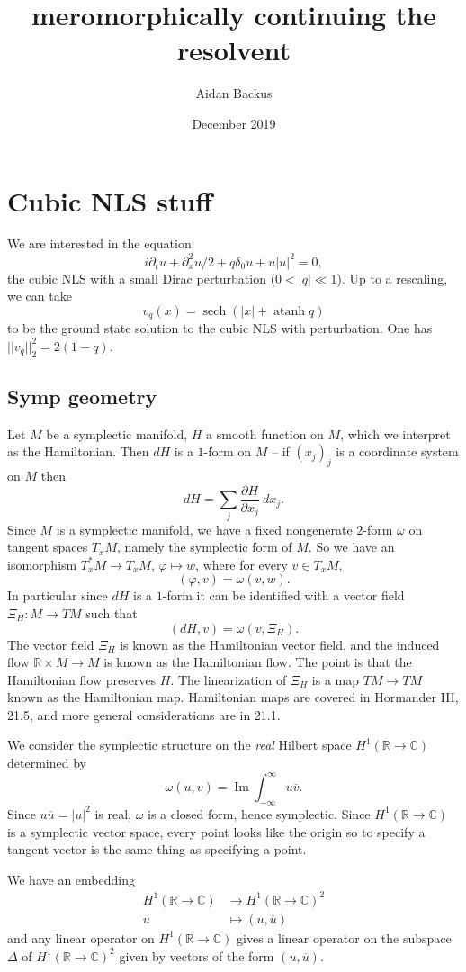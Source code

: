 \documentclass[12pt]{report}
\title{meromorphically continuing the resolvent}
\author{Aidan Backus}
\date{December 2019}
\newcommand{\RR}{\mathbb{R}}
\newcommand{\CC}{\mathbb{C}}
\DeclareMathOperator{\atanh}{atanh}
\DeclareMathOperator{\sech}{sech}
\renewcommand{\Im}{\operatorname{Im}}
\theoremstyle{definition}
\begin{document}
\maketitle

\tableofcontents

\chapter{Cubic NLS stuff}
We are interested in the equation
$$i\partial_t u + \partial_x^2u/2 + q\delta_0 u + u|u|^2 = 0,$$
the cubic NLS with a small Dirac perturbation ($0 < |q| \ll 1$).
Up to a rescaling, we can take
$$v_q(x) = \sech(|x| + \atanh q)$$
to be the ground state solution to the cubic NLS with perturbation. One has $||v_q||_2^2 = 2(1 - q)$.

\section{Symp geometry}
Let $M$ be a symplectic manifold, $H$ a smooth function on $M$, which we interpret as the Hamiltonian.
Then $dH$ is a $1$-form on $M$ -- if $(x_j)_j$ is a coordinate system on $M$ then
$$dH = \sum_j \frac{\partial H}{\partial x_j}~dx_j.$$
Since $M$ is a symplectic manifold, we have a fixed nongenerate $2$-form $\omega$ on tangent spaces $T_xM$, namely the symplectic form of $M$. So we have an isomorphism $T^*_xM \to T_xM$, $\varphi \mapsto w$, where for every $v \in T_xM$,
$$(\varphi, v) = \omega(v, w).$$
In particular since $dH$ is a $1$-form it can be identified with a vector field $\Xi_H: M \to TM$ such that
$$(dH, v) = \omega(v, \Xi_H).$$
The vector field $\Xi_H$ is known as the Hamiltonian vector field, and the induced flow $\RR \times M \to M$ is known as the Hamiltonian flow.
The point is that the Hamiltonian flow preserves $H$.
The linearization of $\Xi_H$ is a map $TM \to TM$ known as the Hamiltonian map. Hamiltonian maps are covered in Hormander III, 21.5, and more general considerations are in 21.1.

We consider the symplectic structure on the \emph{real} Hilbert space $H^1(\RR \to \CC)$ determined by
$$\omega(u, v) = \Im \int_{-\infty}^\infty u\overline v.$$
Since $u\overline u = |u|^2$ is real, $\omega$ is a closed form, hence symplectic.
Since $H^1(\RR \to \CC)$ is a symplectic vector space, every point looks like the origin so to specify a tangent vector is the same thing as specifying a point.

We have an embedding
\begin{align*}
  H^1(\RR \to \CC) &\to H^1(\RR \to \CC)^2\\
  u &\mapsto (u, \overline u)
\end{align*}
and any linear operator on $H^1(\RR \to \CC)$ gives a linear operator on the subspace $\Delta$ of $H^1(\RR \to \CC)^2$ given by vectors of the form $(u, \overline u)$.
\end{document}
